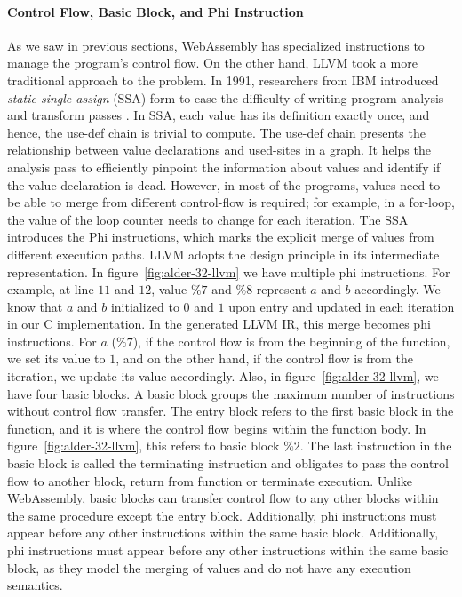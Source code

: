 \paragraph{Control Flow, Basic Block, and Phi Instruction}
As we saw in previous sections, WebAssembly has specialized instructions to manage the program's control flow. On the other hand, LLVM took a more traditional approach to the problem. In 1991, researchers from IBM introduced \emph{static single assign} (SSA) form to ease the difficulty of writing program analysis and transform passes \cite{ibm-ssa}. In SSA, each value has its definition exactly once, and hence, the use-def chain is trivial to compute. The use-def chain presents the relationship between value declarations and used-sites in a graph. It helps the analysis pass to efficiently pinpoint the information about values and identify if the value declaration is dead. However, in most of the programs, values need to be able to merge from different control-flow is required; for example, in a for-loop, the value of the loop counter needs to change for each iteration. The SSA introduces the Phi instructions, which marks the explicit merge of values from different execution paths. LLVM adopts the design principle in its intermediate representation. In figure~\ref{fig:alder-32-llvm} we have multiple phi instructions. For example, at line $11$ and $12$, value $\%7$ and $\%8$ represent $a$ and $b$ accordingly. We know that $a$ and $b$ initialized to $0$ and $1$ upon entry and updated in each iteration in our C implementation. In the generated LLVM IR, this merge becomes phi instructions. For $a$ ($\%7$), if the control flow is from the beginning of the function, we set its value to $1$, and on the other hand, if the control flow is from the iteration, we update its value accordingly. Also, in figure~\ref{fig:alder-32-llvm}, we have four basic blocks. A basic block groups the maximum number of instructions without control flow transfer. The entry block refers to the first basic block in the function, and it is where the control flow begins within the function body. In figure~\ref{fig:alder-32-llvm}, this refers to basic block $\%2$. The last instruction in the basic block is called the terminating instruction and obligates to pass the control flow to another block, return from function or terminate execution. Unlike WebAssembly, basic blocks can transfer control flow to any other blocks within the same procedure except the entry block. Additionally, phi instructions must appear before any other instructions within the same basic block. Additionally, phi instructions must appear before any other instructions within the same basic block, as they model the merging of values and do not have any execution semantics.

